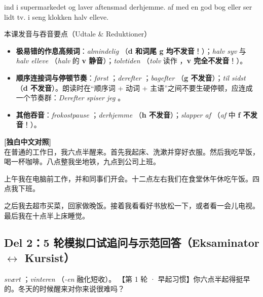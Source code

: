   ind i supermarkedet og laver aftensmad derhjemme.   af med en god bog eller ser lidt tv.   i seng klokken halv elleve.

\begin{tipbox}{本课发音与吞音要点（Udtale \& Reduktioner）}
\begin{itemize}
  \item \textbf{极易错的作息高频词}：\textit{almindelig} （\textbf{d 和词尾 g 均不发音}！）；\textit{halv syv}  与 \textit{halv elleve} （\textit{halv} 的 \textbf{v 静音}）；\textit{tolvtiden} （\textit{tolv} 读作 ，\textbf{v 完全不发音}！）。
  \item \textbf{顺序连接词与停顿节奏}：\textit{først} ；\textit{derefter} ；\textit{bagefter} （\textbf{g 不发音}）；\textit{til sidst} （\textbf{d 不发音}）。朗读时在“顺序词 + 动词 + 主语”之间不要生硬停顿，应连成一个节奏群：\textit{Derefter spiser jeg} 。
  \item \textbf{其他吞音}：\textit{frokostpause} ；\textit{derhjemme} （\textbf{h 不发音}）；\textit{slapper af} （\textit{af} 中 \textbf{f 不发音}！）。
\end{itemize}
\end{tipbox}

\begin{transbox}
\small
\textbf{\color{NCDTeal}[独白中文对照]}\\
在普通的工作日，我六点半醒来。首先我起床、洗漱并穿好衣服。然后我吃早饭，喝一杯咖啡。八点整我坐地铁，九点到公司上班。

上午我在电脑前工作，并和同事们开会。十二点左右我们在食堂休午休吃午饭。四点我下班。

之后我去超市买菜，回家做晚饭。接着我看看好书放松一下，或者看一会儿电视。最后我在十点半上床睡觉。
\end{transbox}

\subsection*{Del 2：5 轮模拟口试追问与示范回答（Eksaminator $\leftrightarrow$ Kursist）}

{\textit{svært} ；\textit{vinteren} （\textit{-en} 融化短收）。}
{【第 1 轮 · 早起习惯】你六点半起得挺早的。冬天的时候醒来对你来说很难吗？}

